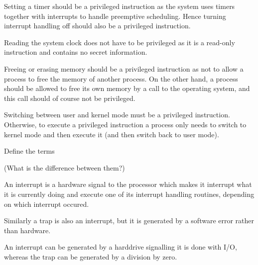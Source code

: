 \documentclass[a4paper,nocourse]{miunasgn}
\begin{document}
\begin{questions}
	\begin{solution}
		Setting a timer should be a privileged instruction as the system uses 
		timers together with interrupts to handle preemptive scheduling.
		Hence turning interrupt handling off should also be a privileged 
		instruction.
		
		Reading the system clock does not have to be privileged as it is 
		a read-only instruction and contains no secret information.

		Freeing or erasing memory should be a privileged instruction as not to 
		allow a process to free the memory of another process.
		On the other hand, a process should be allowed to free its own memory by 
		a call to the operating system, and this call should of course not be 
		privileged.

		Switching between user and kernel mode must be a privileged instruction.
		Otherwise, to execute a privileged instruction a process only needs to 
		switch to kernel mode and then execute it (and then switch back to user 
		mode).
	\end{solution}

	\question\label{q:interrupts}
	Define the terms
	(What is the difference between them?)
	\begin{solution}
		An interrupt is a hardware signal to the processor which makes it interrupt 
		what it is currently doing and execute one of its interrupt handling 
		routines, depending on which interrupt occured.

		Similarly a trap is also an interrupt, but it is generated by a software 
		error rather than hardware.

		An interrupt can be generated by a harddrive signalling it is done with 
		I/O, whereas the trap can be generated by a division by zero.
	\end{solution}


\end{questions}
\end{document}
